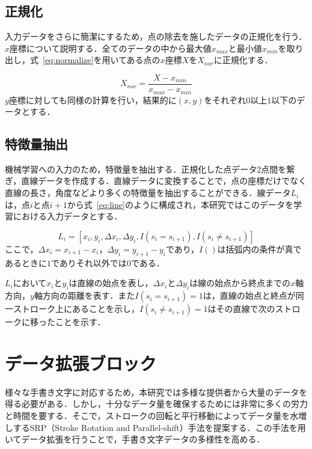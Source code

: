 \subsection{正規化}
\label{normal}
入力データをさらに簡潔にするため，点の除去を施したデータの正規化を行う．
$x$座標について説明する．全てのデータの中から最大値$x_{max}$と最小値$x_{min}$を取り出し，式~\ref{eq:normalize}を用いてある点の$x$座標$X$を$X_{nor}$に正規化する．

\begin{equation}
  X_{nor} = \frac{X - x_{min}}{x_{max}-x_{min}}
  \label{eq:normalize}
\end{equation}
$y$座標に対しても同様の計算を行い，結果的に$(x, y)$をそれぞれ$0$以上$1$以下のデータとする．

\subsection{特徴量抽出}
\label{extract}
機械学習への入力のため，特徴量を抽出する．正規化した点データ2点間を繋ぎ，直線データを作成する．直線データに変換することで，点の座標だけでなく直線の長さ，角度などより多くの特徴量を抽出することができる．線データ$L_i$は，点$i$と点$i+1$から式~\ref{eq:line}のように構成され，本研究ではこのデータを学習における入力データとする．

\begin{equation}
  L_i = [x_i, y_i, \Delta{x_i}, \Delta{y_i}, I(s_i=s_{i+1}), I(s_i \neq s_{i+1})]
  \label{eq:line}
\end{equation}
ここで，$\Delta{x_i}=x_{i+1}-x_i$，$\Delta{y_i}=y_{i+1}-y_i$であり，$I()$は括弧内の条件が真であるときに$1$でありそれ以外では$0$である．

$L_i$において$x_i$と$y_i$は直線の始点を表し，$\Delta{x_i}$と$\Delta{y_i}$は線の始点から終点までの$x$軸方向，$y$軸方向の距離を表す．また$I(s_i=s_{i+1})=1$は，直線の始点と終点が同一ストローク上にあることを示し，$I(s_i \neq s_{i+1})=1$はその直線で次のストロークに移ったことを示す．

\section{データ拡張ブロック}
\label{augment}
様々な手書き文字に対応するため，本研究では多様な提供者から大量のデータを得る必要がある．しかし，十分なデータ量を確保するためには非常に多くの労力と時間を要する．そこで，ストロークの回転と平行移動によってデータ量を水増しするSRP（Stroke Rotation and Parallel-shift）手法を提案する．この手法を用いてデータ拡張を行うことで，手書き文字データの多様性を高める．

